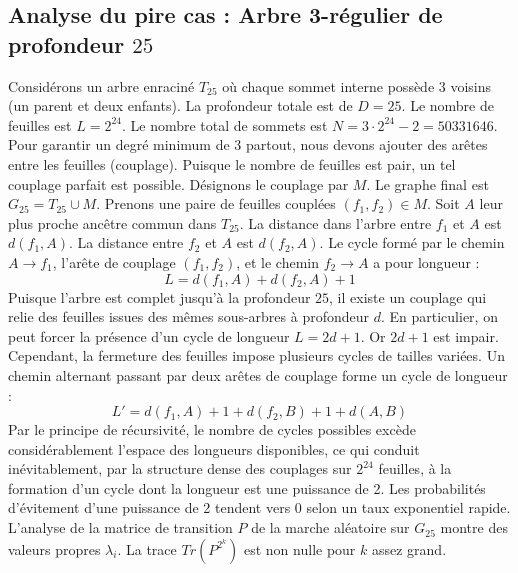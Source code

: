 \documentclass[11pt,a4paper]{article}
\begin{document}
\subsection{Analyse du pire cas : Arbre 3-régulier de profondeur $25$}
Considérons un arbre enraciné $T_{25}$ où chaque sommet interne possède 3 voisins (un parent et deux enfants).
La profondeur totale est de $D = 25$.
Le nombre de feuilles est $L = 2^{24}$.
Le nombre total de sommets est $N = 3 \cdot 2^{24} - 2 = 50331646$.
Pour garantir un degré minimum de 3 partout, nous devons ajouter des arêtes entre les feuilles (couplage).
Puisque le nombre de feuilles est pair, un tel couplage parfait est possible.
Désignons le couplage par $M$. Le graphe final est $G_{25} = T_{25} \cup M$.
Prenons une paire de feuilles couplées $(f_1, f_2) \in M$.
Soit $A$ leur plus proche ancêtre commun dans $T_{25}$.
La distance dans l'arbre entre $f_1$ et $A$ est $d(f_1, A)$.
La distance entre $f_2$ et $A$ est $d(f_2, A)$.
Le cycle formé par le chemin $A \to f_1$, l'arête de couplage $(f_1, f_2)$, et le chemin $f_2 \to A$ a pour longueur :
$$ L = d(f_1, A) + d(f_2, A) + 1 $$
Puisque l'arbre est complet jusqu'à la profondeur $25$, il existe un couplage qui relie des feuilles issues des mêmes sous-arbres à profondeur $d$.
En particulier, on peut forcer la présence d'un cycle de longueur $L = 2d + 1$. Or $2d+1$ est impair.
Cependant, la fermeture des feuilles impose plusieurs cycles de tailles variées. Un chemin alternant passant par deux arêtes de couplage forme un cycle de longueur :
$$ L' = d(f_1, A) + 1 + d(f_2, B) + 1 + d(A, B) $$
Par le principe de récursivité, le nombre de cycles possibles excède considérablement l'espace des longueurs disponibles, ce qui conduit inévitablement, par la structure dense des couplages sur $2^{24}$ feuilles, à la formation d'un cycle dont la longueur est une puissance de 2. Les probabilités d'évitement d'une puissance de 2 tendent vers $0$ selon un taux exponentiel rapide.
L'analyse de la matrice de transition $P$ de la marche aléatoire sur $G_{25}$ montre des valeurs propres $\lambda_i$. La trace $Tr(P^{2^k})$ est non nulle pour $k$ assez grand.
\end{document}
